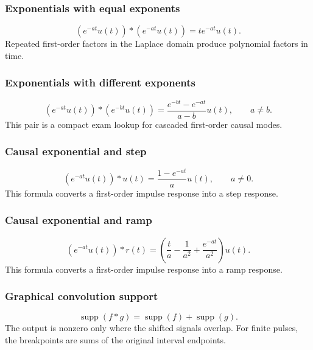 \subsubsection{Exponentials with equal exponents}
\[
\left(e^{-at}u(t)\right)*\left(e^{-at}u(t)\right)
=t e^{-at}u(t).
\]
Repeated first-order factors in the Laplace domain produce polynomial factors in time.

\subsubsection{Exponentials with different exponents}
\[
\left(e^{-at}u(t)\right)*\left(e^{-bt}u(t)\right)
=\frac{e^{-bt}-e^{-at}}{a-b}u(t), \qquad a\neq b.
\]
This pair is a compact exam lookup for cascaded first-order causal modes.

\subsubsection{Causal exponential and step}
\[
\left(e^{-at}u(t)\right)*u(t)=\frac{1-e^{-at}}{a}u(t), \qquad a\neq 0.
\]
This formula converts a first-order impulse response into a step response.

\subsubsection{Causal exponential and ramp}
\[
\left(e^{-at}u(t)\right)*r(t)
=\left(\frac{t}{a}-\frac{1}{a^2}+\frac{e^{-at}}{a^2}\right)u(t).
\]
This formula converts a first-order impulse response into a ramp response.

\subsubsection{Graphical convolution support}
\[
\operatorname{supp}(f*g)=\operatorname{supp}(f)+\operatorname{supp}(g).
\]
The output is nonzero only where the shifted signals overlap. For finite pulses, the breakpoints are sums of the original interval endpoints.
